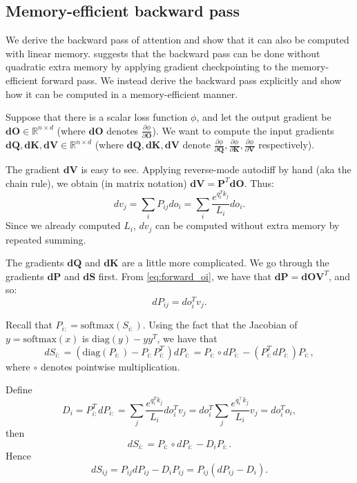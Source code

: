 \documentclass{article}
\newcommand{\diag}{\mathrm{diag}}
\newcommand{\softmax}{\mathrm{softmax}}
\newcommand{\vQ}{\mathbf{Q}}
\newcommand{\vK}{\mathbf{K}}
\newcommand{\vV}{\mathbf{V}}
\newcommand{\vdQ}{\mathbf{dQ}}
\newcommand{\vdK}{\mathbf{dK}}
\newcommand{\vdV}{\mathbf{dV}}
\newcommand{\vdS}{\mathbf{dS}}
\newcommand{\vP}{\mathbf{P}}
\newcommand{\vdP}{\mathbf{dP}}
\newcommand{\vO}{\mathbf{O}}
\newcommand{\vdO}{\mathbf{dO}}
\begin{document}
\subsection{Memory-efficient backward pass}
\label{sec:backward}

We derive the backward pass of attention and show that it can also be computed
with linear memory.
\citet{rabe2021self} suggests that the backward pass can be done without
quadratic extra memory by applying gradient checkpointing to the
memory-efficient forward pass.
We instead derive the backward pass explicitly and show how it can be computed
in a memory-efficient manner.

Suppose that there is a scalar loss function $\phi$, and let the output gradient
be $\vdO \in \mathbb{R}^{n \times d}$ (where $\vdO$ denotes
$\frac{\partial \phi}{\partial \vO}$).
We want to compute the input gradients $\vdQ, \vdK, \vdV \in \mathbb{R}^{n \times d}$
(where $\vdQ, \vdK, \vdV$ denote
$\frac{\partial \phi}{\partial \vQ}, \frac{\partial \phi}{\partial \vK}, \frac{\partial \phi}{\partial \vV}$
respectively).

The gradient $\vdV$ is easy to see.
Applying reverse-mode autodiff by hand (aka the chain rule), we obtain (in
matrix notation) $\vdV = \vP^T \vdO$.
Thus:
\begin{equation}
  \label{eq:dv}
  dv_j = \sum_{i} P_{ij} do_i = \sum_{i} \frac{e^{q_i^T k_j}}{L_i} do_i.
\end{equation}
Since we already computed $L_i$, $dv_j$ can be computed without extra memory by
repeated summing.

The gradients $\vdQ$ and $\vdK$ are a little more complicated.
We go through the gradients $\vdP$ and $\vdS$ first.
From \cref{eq:forward_oi}, we have that $\vdP = \vdO \vV^T$, and so:
\begin{equation*}
  dP_{ij} = do_i^T v_j.
\end{equation*}

Recall that $P_{i:} = \softmax(S_{i:})$.
Using the fact that the Jacobian of $y = \softmax(x)$ is $\diag(y) - y y^T$, we
have that
\begin{equation*}
  dS_{i:} = (\diag(P_{i:}) - P_{i:} P_{i:}^T) dP_{i:} = P_{i:} \circ dP_{i:} - (P_{i:}^T dP_{i:}) P_{i:},
\end{equation*}
where $\circ$ denotes pointwise multiplication.

Define
\begin{equation}
  \label{eq:D_i}
  D_{i} = P_{i:}^T dP_{i:} = \sum_{j} \frac{e^{q_i^T k_j}}{L_i} do_i^T v_j = do_i^T \sum_{j} \frac{e^{q_i^\top k_j}}{L_i} v_j = do_i^T o_i,
\end{equation}
then
\begin{equation*}
  dS_{i:} = P_{i:} \circ dP_{i:} - D_i P_{i:}.
\end{equation*}
Hence
\begin{equation*}
  dS_{ij} = P_{ij} dP_{ij} - D_i P_{ij} = P_{ij} (dP_{ij} - D_i).
\end{equation*}
\end{document}

